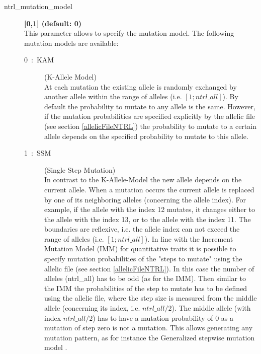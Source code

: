 \documentclass[letterpaper,12pt,oneside]{book}
\begin{document}
\begin{description}
\item[ntrl\_mutation\_model] \textbf{[0,1] (default: 0)}\\
This parameter allows to specify the mutation model. The following mutation models are available:
\begin{description}
\item[0~:~KAM] (K-Allele Model)\\
At each mutation the existing allele is randomly exchanged by another allele within the range of alleles (i.e. $[1; ntrl\_all]$). By default the probability to mutate to any allele is the same. However, if the mutation probabilities are specified explicitly by the allelic file (see section \ref{allelicFileNTRL}) the probability to mutate to a certain allele depends on the specified probability to mutate to this allele.

\item[1~:~SSM] (Single Step Mutation)\\
In contrast to the K-Allele-Model the new allele depends on the current allele. When a mutation occurs the current allele is replaced by one of its neighboring alleles (concerning the allele index). For example, if the allele with the index 12 mutates, it changes either to the allele with the index 13, or to the allele with the index 11. The boundaries are reflexive, i.e. the allele index can not exceed the range of alleles (i.e. $[1; ntrl\_all]$). In line with the Increment Mutation Model (IMM) for quantitative traits it is possible to specify mutation probabilities of the "steps to mutate" using the allelic file (see section \ref{allelicFileNTRL}). In this case the number of alleles (\textsf{ntrl\_all}) has to be odd (as for the IMM). Then similar to the IMM the probabilities of the step to mutate has to be defined using the allelic file, where the step size is measured from the middle allele (concerning its index, i.e. $ntrl\_all/2$). The middle allele (with index $ntrl\_all/2$) has to have a mutation probability of 0 as a mutation of step zero is not a mutation. This allows generating any mutation pattern, as for instance the Generalized stepwise mutation model \citep{Estoup_2002}.
\end{description}
\end{description}
\end{document}
